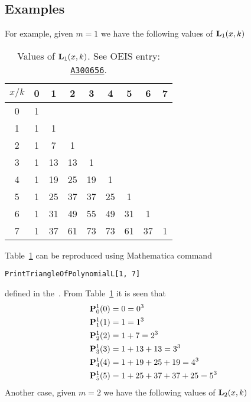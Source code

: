 \subsection{Examples} \label{subsec:examples}
For example, given $m=1$ we have the following values of ${\mathbf{L}}\sb{1}(x,k)$
\begin{table}[H]
    \begin{tabular}{c|cccccccc}
        $x/k$ & 0 & 1  & 2  & 3  & 4  & 5  & 6  & 7 \\[3px]
        \hline
        0     & 1 &    &    &    &    &    &    &   \\
        1     & 1 & 1  &    &    &    &    &    &   \\
        2     & 1 & 7  & 1  &    &    &    &    &   \\
        3     & 1 & 13 & 13 & 1  &    &    &    &   \\
        4     & 1 & 19 & 25 & 19 & 1  &    &    &   \\
        5     & 1 & 25 & 37 & 37 & 25 & 1  &    &   \\
        6     & 1 & 31 & 49 & 55 & 49 & 31 & 1  &   \\
        7     & 1 & 37 & 61 & 73 & 73 & 61 & 37 & 1
    \end{tabular}
    \caption{Values of ${\mathbf{L}}\sb{1}(x,k)$. See OEIS entry: \href{https://oeis.org/A300656}{\texttt{A300656}}.}
    \label{tab:tab_3}
\end{table}
Table~\ref{tab:tab_3} can be reproduced using Mathematica command
\begin{center}
    \texttt{PrintTriangleOfPolynomialL[1, 7]}
\end{center}
defined in the~\cite{PK22Source}.
From Table~\ref{tab:tab_3} it is seen that
\begin{equation*}
    \begin{split}
        {\mathbf{P}}\sp{1} \sb{0}(0) &= 0 = 0^3 \\
        {\mathbf{P}}\sp{1} \sb{1}(1) &= 1 = 1^3 \\
        {\mathbf{P}}\sp{1} \sb{2}(2) &= 1+7 = 2^3 \\
        {\mathbf{P}}\sp{1} \sb{3}(3) &= 1+13+13 = 3^3 \\
        {\mathbf{P}}\sp{1} \sb{4}(4) &= 1+19+25+19 = 4^3 \\
        {\mathbf{P}}\sp{1} \sb{5}(5) &= 1+25+37+37+25 = 5^3
    \end{split}
\end{equation*}
Another case, given $m=2$ we have the following values of ${\mathbf{L}}\sb{2}(x,k)$
